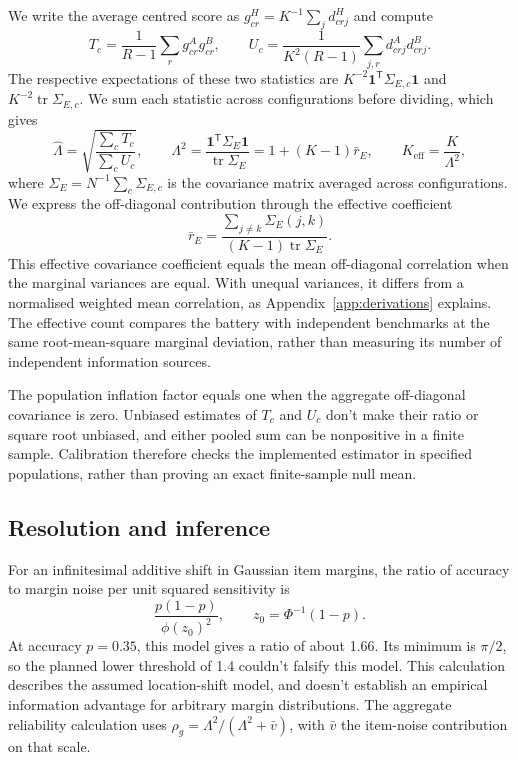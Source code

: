 \documentclass{article}
\newcommand{\Lam}{\Lambda}
\newcommand{\Sig}{\Sigma_E}
\begin{document}
We write the average centred score as $g^H_{cr}=K^{-1}\sum_j d^H_{crj}$ and compute
\begin{equation}
T_c=\frac{1}{R-1}\sum_r g^A_{cr}g^B_{cr},\qquad
U_c=\frac{1}{K^2(R-1)}\sum_{j,r}d^A_{crj}d^B_{crj}.
\label{eq:tu}
\end{equation}
The respective expectations of these two statistics are $K^{-2}\mathbf{1}^{\mathsf T}\Sigma_{E,c}\mathbf{1}$ and $K^{-2}\operatorname{tr}\Sigma_{E,c}$. We sum each statistic across configurations before dividing, which gives
\begin{equation}
\widehat\Lam=\sqrt{\frac{\sum_c T_c}{\sum_c U_c}},\qquad
\Lam^2=\frac{\mathbf{1}^{\mathsf T}\Sig\mathbf{1}}{\operatorname{tr}\Sig}
=1+(K-1)\bar r_E,\qquad K_{\mathrm{eff}}=\frac{K}{\Lam^2},
\label{eq:lambda}
\end{equation}
where $\Sig=N^{-1}\sum_c\Sigma_{E,c}$ is the covariance matrix averaged across configurations. We express the off-diagonal contribution through the effective coefficient
\begin{equation}
\bar r_E=\frac{\sum_{j\ne k}\Sigma_E(j,k)}{(K-1)\operatorname{tr}\Sig}.
\label{eq:effective}
\end{equation}
This effective covariance coefficient equals the mean off-diagonal correlation when the marginal variances are equal. With unequal variances, it differs from a normalised weighted mean correlation, as Appendix~\ref{app:derivations} explains. The effective count compares the battery with independent benchmarks at the same root-mean-square marginal deviation, rather than measuring its number of independent information sources.

The population inflation factor equals one when the aggregate off-diagonal covariance is zero. Unbiased estimates of $T_c$ and $U_c$ don't make their ratio or square root unbiased, and either pooled sum can be nonpositive in a finite sample. Calibration therefore checks the implemented estimator in specified populations, rather than proving an exact finite-sample null mean.

\subsection{Resolution and inference}
For an infinitesimal additive shift in Gaussian item margins, the ratio of accuracy to margin noise per unit squared sensitivity is
\begin{equation}
\frac{p(1-p)}{\phi(z_0)^2},\qquad z_0=\Phi^{-1}(1-p).
\label{eq:information}
\end{equation}
At accuracy $p=0.35$, this model gives a ratio of about 1.66. Its minimum is $\pi/2$, so the planned lower threshold of 1.4 couldn't falsify this model. This calculation describes the assumed location-shift model, and doesn't establish an empirical information advantage for arbitrary margin distributions. The aggregate reliability calculation uses $\rho_g=\Lam^2/(\Lam^2+\bar v)$, with $\bar v$ the item-noise contribution on that scale.
\end{document}
